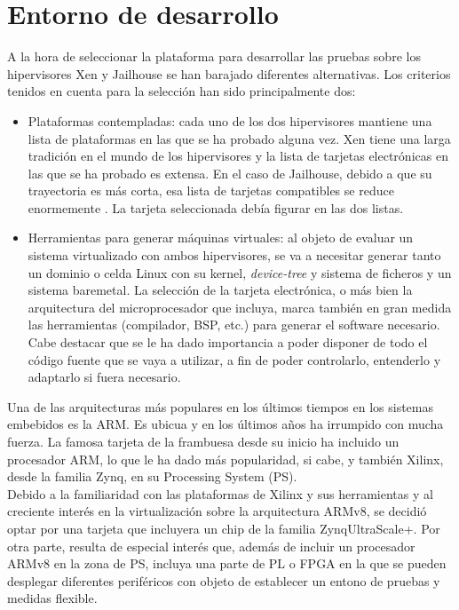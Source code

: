 \chapter{Entorno de desarrollo}

A la hora de seleccionar la plataforma para desarrollar las pruebas sobre los hipervisores Xen y Jailhouse se han barajado diferentes alternativas. Los criterios tenidos en cuenta para la selección han sido principalmente dos:
\begin{itemize}
  \item Plataformas contempladas: cada uno de los dos hipervisores mantiene una lista de plataformas en las que se ha probado alguna vez. Xen tiene una larga tradición en el mundo de los hipervisores y la lista de tarjetas electrónicas en las que se ha probado es extensa. En el caso de Jailhouse, debido a que su trayectoria es más corta, esa lista de tarjetas compatibles se reduce enormemente \cite{jailhouse_github}. La tarjeta seleccionada debía figurar en las dos listas.
  \item Herramientas para generar máquinas virtuales: al objeto de evaluar un sistema virtualizado con ambos hipervisores, se va a necesitar generar tanto un dominio o celda Linux con su kernel, \textit{device-tree} y sistema de ficheros y un sistema baremetal. La selección de la tarjeta electrónica, o más bien la arquitectura del microprocesador que incluya, marca también en gran medida las herramientas (compilador, BSP, etc.) para generar el software necesario. Cabe destacar que se le ha dado importancia a poder disponer de todo el código fuente que se vaya a utilizar, a fin de poder controlarlo, entenderlo y adaptarlo si fuera necesario.
\end{itemize}

Una de las arquitecturas más populares en los últimos tiempos en los sistemas embebidos es la ARM. Es ubicua y en los últimos años ha irrumpido con mucha fuerza. La famosa tarjeta de la frambuesa desde su inicio ha incluido un procesador ARM, lo que le ha dado más popularidad, si cabe, y también Xilinx, desde la familia Zynq, en su Processing System (\acrshort{PS}).\\
Debido a la familiaridad con las plataformas de Xilinx y sus herramientas y al creciente interés en la virtualización sobre la arquitectura ARMv8, se decidió optar por una tarjeta que incluyera un chip de la familia Zynq\textregistered UltraScale+\texttrademark. Por otra parte, resulta de especial interés que, además de incluir un procesador ARMv8 en la zona de PS, incluya una parte de \acrshort{PL} o \acrshort{FPGA} en la que se pueden desplegar diferentes periféricos con objeto de establecer un entono de pruebas y medidas flexible.

